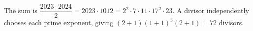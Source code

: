 The sum is $\dfrac{2023\cdot2024}{2}=2023\cdot1012=2^2\cdot7\cdot11\cdot17^2\cdot23 $. A divisor independently chooses each prime exponent, giving $(2+1)(1+1)^3(2+1)=\boxed{72}$ divisors.
